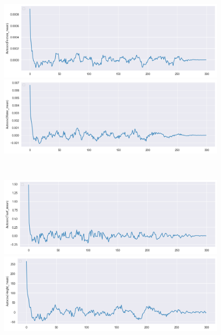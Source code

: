 \documentclass[12pt, bachelor, substylefile = algo_title.rtx]{disser}
\theoremstyle{definition}
\begin{document}
\begin{figure}[!h]
   \begin{minipage}{.48\textwidth}
     \includegraphics[width=\linewidth]{acov1}
   \end{minipage} \hfill
\begin{minipage}{.48\textwidth}
     \includegraphics[width=\linewidth]{acov2}
   \end{minipage}\\
\begin{minipage}{.48\textwidth}
     \includegraphics[width=\linewidth]{acov3}
   \end{minipage} \hfill
\begin{minipage}{.48\textwidth}
     \includegraphics[width=\linewidth]{acov4}

\end{minipage}
\end{figure}
\end{document}
